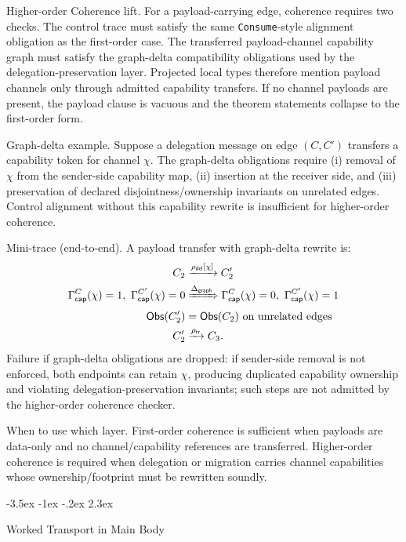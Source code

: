 \documentclass[a4paper,10pt,twocolumn,english]{article}
\makeatletter
\renewcommand{\section}{\@startsection{section}{1}{\z@}%
  {-3.5ex \@plus -1ex \@minus -.2ex}%
  {2.3ex}%
  {\raggedright\normalfont\large\bfseries}}
\numberwithin{equation}{section}
\theoremstyle{paperdef}
\theoremstyle{paperplain}
\theoremstyle{paperdef}
\theoremstyle{paperremark}
\theoremstyle{paperdef}
\newcommand{\Obs}{\ensuremath{\mathsf{Obs}}}
\makeatother
\begin{document}
Higher-order Coherence lift. For a payload-carrying edge, coherence requires two checks. The control trace must satisfy the same \texttt{Consume}-style alignment obligation as the first-order case. The transferred payload-channel capability graph must satisfy the graph-delta compatibility obligations used by the delegation-preservation layer. Projected local types therefore mention payload channels only through admitted capability transfers. If no channel payloads are present, the payload clause is vacuous and the theorem statements collapse to the first-order form.

Graph-delta example. Suppose a delegation message on edge $(C,C')$ transfers a
capability token for channel $\chi$. The graph-delta obligations require
(i) removal of $\chi$ from the sender-side capability map,
(ii) insertion at the receiver side, and
(iii) preservation of declared disjointness/ownership invariants on unrelated
edges. Control alignment without this capability rewrite is insufficient for
higher-order coherence.

Mini-trace (end-to-end). A payload transfer with graph-delta rewrite is:
\[
	\begin{aligned}[t]
		C_2        & \xrightarrow{\rho_{\mathsf{del}}[\chi]} C_2'              \\
		\Gamma_{\mathsf{cap}}^{C}(\chi)=1,\ \Gamma_{\mathsf{cap}}^{C'}(\chi)=0
		           & \xRightarrow{\Delta_{\mathsf{graph}}}
		\Gamma_{\mathsf{cap}}^{C}(\chi)=0,\ \Gamma_{\mathsf{cap}}^{C'}(\chi)=1 \\
		\Obs(C_2') & = \Obs(C_2)\ \text{on unrelated edges}                    \\
		C_2'       & \xrightarrow{\rho_{\mathsf{tr}}} C_3.
	\end{aligned}
\]
Failure if graph-delta obligations are dropped: if sender-side removal is not
enforced, both endpoints can retain $\chi$, producing duplicated capability
ownership and violating delegation-preservation invariants; such steps are not
admitted by the higher-order coherence checker.

When to use which layer. First-order coherence is sufficient when payloads are
data-only and no channel/capability references are transferred. Higher-order
coherence is required when delegation or migration carries channel capabilities
whose ownership/footprint must be rewritten soundly.

\section{Worked Transport in Main Body}
\label{sec:transport}
\end{document}
